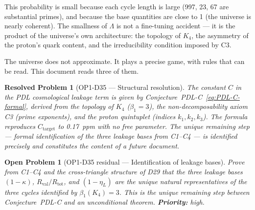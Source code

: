 \documentclass[12pt,a4paper]{article}
\newtheorem{openproblem}{Open Problem}
\newtheorem{resolvedproblem}{Resolved Problem}
\newcommand{\Kfour}{K_4}
\newcommand{\Rtot}{R_{\mathrm{tot}}}
\newcommand{\Rval}{R_{\mathrm{val}}}
\newcommand{\kap}{\kappa}
\newcommand{\etaL}{\eta_L}
\newcommand{\Lam}{\Lambda}
\begin{document}
This probability is small because each cycle length is large (997, 23, 67 are substantial primes), and because the base quantities are close to 1 (the universe is nearly coherent). The smallness of $\Lam$ is not a fine-tuning accident — it is the product of the universe's own architecture: the topology of $\Kfour$, the asymmetry of the proton's quark content, and the irreducibility condition imposed by C3.

The universe does not approximate. It plays a precise game, with rules that can be read. This document reads three of them.

\begin{resolvedproblem}[OP1-D35 — Structural resolution]
The constant $C$ in the PDL cosmological leakage term is given by Conjecture~PDL-C~\eqref{eq:PDL-C-formal}, derived from the topology of $\Kfour$ ($\beta_1 = 3$), the non-decomposability axiom C3 (prime exponents), and the proton quintuplet (indices $k_1, k_2, k_3$). The formula reproduces $C_{\text{target}}$ to 0.17~ppm with no free parameter. The unique remaining step — formal identification of the three leakage bases from C1--C4 — is identified precisely and constitutes the content of a future document.
\end{resolvedproblem}

\begin{openproblem}[OP1-D35 residual — Identification of leakage bases]
Prove from C1--C4 and the cross-triangle structure of D29 that the three leakage bases $(1-\kap)$, $\Rval/\Rtot$, and $(1-\etaL)$ are the unique natural representatives of the three cycles identified by $\beta_1(\Kfour) = 3$. This is the unique remaining step between Conjecture~PDL-C and an unconditional theorem. \textbf{Priority:} high.
\end{openproblem}

\clearpage


\end{document}
